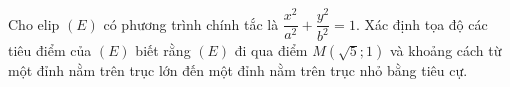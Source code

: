 \begin{bt}%
	Cho elip $(E)$ có phương trình chính tắc là $\dfrac{x^2}{a^2} + \dfrac{y^2}{b^2} = 1$. Xác định tọa độ các tiêu điểm của $(E)$ biết rằng $(E)$ đi qua điểm $M(\sqrt{5};1)$ và khoảng cách từ một đỉnh nằm trên trục lớn đến một đỉnh nằm trên trục nhỏ bằng tiêu cự.
\end{bt}

